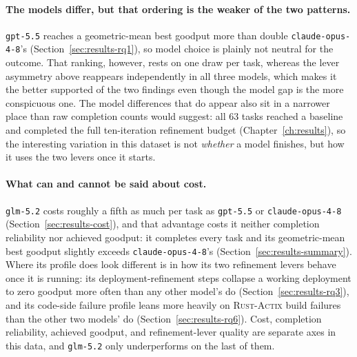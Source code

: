 \paragraph{The models differ, but that ordering is the weaker of the two
patterns.} \texttt{gpt-5.5} reaches a geometric-mean best goodput more
than double \texttt{claude-opus-4-8}'s (Section~\ref{sec:results-rq1}), so
model choice is plainly not neutral for the outcome. That ranking,
however, rests on one draw per task, whereas the lever asymmetry above
reappears independently in all three models, which makes it the better
supported of the two findings even though the model gap is the more
conspicuous one. The model differences that do appear also sit in a
narrower place than raw completion counts would suggest: all 63 tasks
reached a baseline and completed the full ten-iteration refinement budget
(Chapter~\ref{ch:results}), so the interesting variation in this dataset
is not \emph{whether} a model finishes, but how it uses the two levers
once it starts.

\paragraph{What can and cannot be said about cost.} \texttt{glm-5.2} costs
roughly a fifth as much per task as \texttt{gpt-5.5} or
\texttt{claude-opus-4-8} (Section~\ref{sec:results-cost}),
and that advantage costs it neither completion reliability nor achieved
goodput: it completes every task and its geometric-mean best goodput
slightly exceeds \texttt{claude-opus-4-8}'s
(Section~\ref{sec:results-summary}). Where its profile does look
different is in
how its two refinement levers behave once it is running: its
deployment-refinement steps collapse a working deployment to zero goodput
more often than any other model's do (Section~\ref{sec:results-rq3}), and
its code-side failure profile leans more heavily on \textsc{Rust-Actix}
build failures than the other two models' do (Section~\ref{sec:results-rq6}).
Cost, completion reliability,
achieved goodput, and refinement-lever quality are separate axes in this
data, and \texttt{glm-5.2} only underperforms on the last of them.

